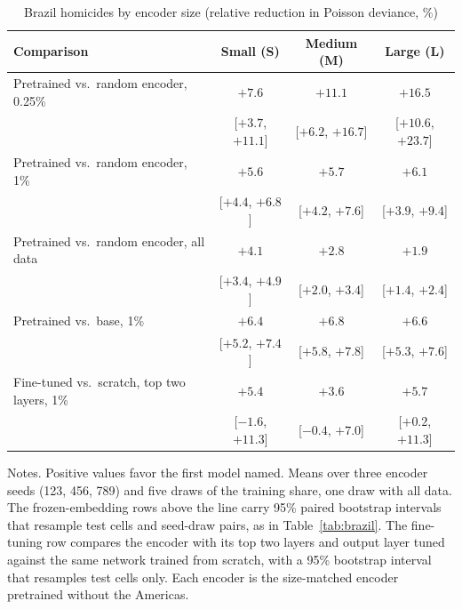 \documentclass[11pt, letterpaper]{article}
\begin{document}
\begin{table}[!htbp]
\centering\footnotesize
\caption{Brazil homicides by encoder size (relative reduction in Poisson deviance, \%)}
\label{tab:sizes_brazil}
\begin{tabular}{lccc}
\hline
Comparison & Small (S) & Medium (M) & Large (L) \\
\hline
Pretrained vs.\ random encoder, 0.25\% & $+7.6$ & $+11.1$ & $+16.5$ \\
& [$+3.7$, $+11.1$] & [$+6.2$, $+16.7$] & [$+10.6$, $+23.7$] \\
Pretrained vs.\ random encoder, 1\% & $+5.6$ & $+5.7$ & $+6.1$ \\
& [$+4.4$, $+6.8$] & [$+4.2$, $+7.6$] & [$+3.9$, $+9.4$] \\
Pretrained vs.\ random encoder, all data & $+4.1$ & $+2.8$ & $+1.9$ \\
& [$+3.4$, $+4.9$] & [$+2.0$, $+3.4$] & [$+1.4$, $+2.4$] \\
Pretrained vs.\ base, 1\% & $+6.4$ & $+6.8$ & $+6.6$ \\
& [$+5.2$, $+7.4$] & [$+5.8$, $+7.8$] & [$+5.3$, $+7.6$] \\
\hline
Fine-tuned vs.\ scratch, top two layers, 1\% & $+5.4$ & $+3.6$ & $+5.7$ \\
& [$-1.6$, $+11.3$] & [$-0.4$, $+7.0$] & [$+0.2$, $+11.3$] \\
\hline
\end{tabular}
\begin{minipage}{0.92\textwidth}\footnotesize\vspace{0.5ex}
Notes. Positive values favor the first model named. Means over three encoder seeds (123, 456, 789) and five draws of the training share, one draw with all data. The frozen-embedding rows above the line carry 95\% paired bootstrap intervals that resample test cells and seed-draw pairs, as in Table~\ref{tab:brazil}. The fine-tuning row compares the encoder with its top two layers and output layer tuned against the same network trained from scratch, with a 95\% bootstrap interval that resamples test cells only. Each encoder is the size-matched encoder pretrained without the Americas.
\end{minipage}
\end{table}
\end{document}
